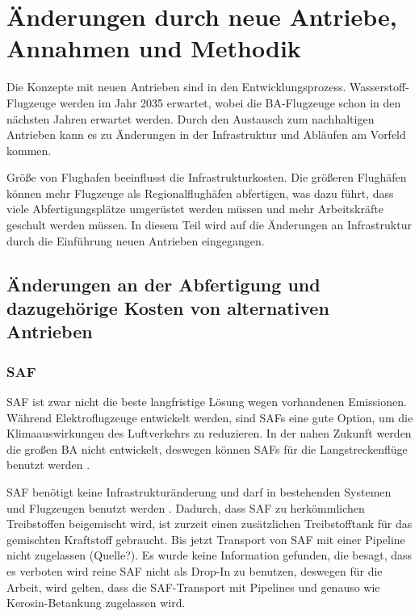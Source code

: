 \chapter{Änderungen durch neue Antriebe, Annahmen und Methodik}
\label{ch:Änderungen durch neue Antriebe, Annahmen und Methodik}

Die Konzepte mit neuen Antrieben sind in den Entwicklungsprozess. Wasserstoff-Flugzeuge werden im Jahr 2035 erwartet, wobei die BA-Flugzeuge
schon in den nächsten Jahren erwartet werden.
Durch den Austausch zum nachhaltigen Antrieben kann es zu Änderungen in der Infrastruktur und Abläufen am Vorfeld kommen.


Größe von Flughafen beeinflusst die Infrastrukturkosten. Die größeren Flughäfen können mehr Flugzeuge als Regionalflughäfen 
abfertigen, was dazu führt, dass viele Abfertigungsplätze umgerüstet werden müssen und 
mehr Arbeitskräfte geschult werden müssen. In diesem Teil wird auf die Änderungen an Infrastruktur durch die Einführung 
neuen Antrieben eingegangen.

\section{Änderungen an der Abfertigung und dazugehörige Kosten von alternativen Antrieben}
\label{s:Änderungen an der Abfertigung und dazugehörige Kosten von alternativen Antrieben}

\subsection{SAF}

SAF ist zwar nicht die beste langfristige Lösung wegen vorhandenen Emissionen. 
Während Elektroflugzeuge entwickelt werden, sind SAFs eine gute Option, um die Klimaauswirkungen des Luftverkehrs zu reduzieren.
In der nahen Zukunft werden die großen BA nicht entwickelt, deswegen können SAFs für die Langstreckenflüge benutzt werden \cite{dalmia2022powering}.


SAF benötigt keine Infrastrukturänderung und darf in bestehenden Systemen und Flugzeugen benutzt werden \cite{dalmia2022powering}.
Dadurch, dass SAF zu herkömmlichen Treibstoffen beigemischt wird, ist zurzeit einen zusätzlichen Treibstofftank 
für das gemischten Kraftstoff gebraucht. Bis jetzt Transport von SAF mit einer Pipeline nicht zugelassen (Quelle?).
Es wurde keine Information gefunden, die besagt, dass es verboten wird reine SAF nicht als
Drop-In zu benutzen, deswegen für die Arbeit, wird gelten, dass die SAF-Transport mit Pipelines und genauso wie Kerosin-Betankung zugelassen wird.

